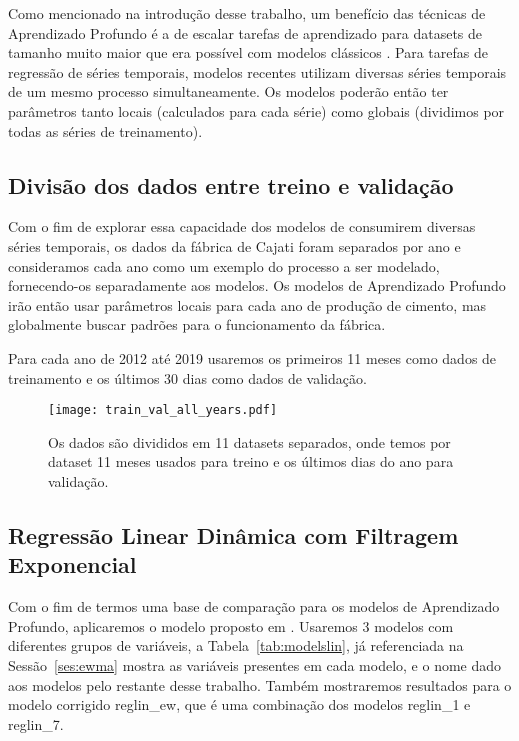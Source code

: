 Como mencionado na introdução desse trabalho, um benefício das técnicas de
Aprendizado Profundo é a de escalar tarefas de aprendizado para datasets de
tamanho muito maior que era possível com modelos clássicos \citep{dlbook}.
Para tarefas de regressão de séries temporais, modelos recentes utilizam
diversas séries temporais de um mesmo processo simultaneamente.
Os modelos poderão então ter parâmetros tanto locais (calculados
para cada série) como globais (dividimos por todas as séries de treinamento).

\subsection{Divisão dos dados entre treino e validação}

Com o fim de explorar essa capacidade dos modelos de consumirem diversas séries
temporais, os dados da fábrica de Cajati foram separados por ano e consideramos
cada ano como um exemplo do processo a ser modelado, fornecendo-os separadamente
aos modelos. Os modelos de Aprendizado
Profundo irão então usar parâmetros locais para cada ano de produção de cimento,
mas globalmente buscar padrões para o funcionamento da fábrica. 

Para cada ano de 2012 até 2019 usaremos os primeiros 11 meses como dados de
treinamento e os últimos 30 dias como dados de validação.


\begin{figure}[H]
  \centering
  \texttt{[image: train\_val\_all\_years.pdf]} 
  \caption{Os dados são divididos em 11 datasets separados, onde temos por
    dataset 11 meses usados para treino e os últimos dias do ano para validação.} 
  \label{fig:trainvalallyears}
\end{figure}

\subsection{Regressão Linear Dinâmica com Filtragem Exponencial}

Com o fim de termos uma base de comparação para os modelos de
Aprendizado Profundo, aplicaremos o modelo proposto em \citep{grecialin}.
Usaremos 3 modelos com diferentes grupos de variáveis, a
Tabela~\ref{tab:modelslin}, já referenciada na Sessão~\ref{ses:ewma} mostra
as variáveis presentes em cada modelo, e o nome dado aos modelos pelo restante
desse trabalho. Também mostraremos resultados para o modelo corrigido
reglin\_ew, que é uma combinação dos modelos reglin\_1 e reglin\_7.



